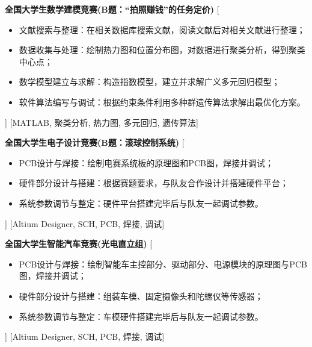 \documentclass[zh]{resume}
\begin{document}
\begin{experiences}
    {\textbf{全国大学生数学建模竞赛(B题：“拍照赚钱”的任务定价)}}%
    [%
        \begin{itemize}
            \item {文献搜索与整理：在相关数据库搜索文献，阅读文献后对相关文献进行整理；}
            \item {数据收集与处理：绘制热力图和位置分布图，对数据进行聚类分析，得到聚类中心点；}
            \item {数学模型建立与求解：构造指数模型，建立并求解广义多元回归模型；}
            \item {软件算法编写与调试：根据约束条件利用多种群遗传算法求解出最优化方案。}
        \end{itemize}]
    [MATLAB, 聚类分析, 热力图, 多元回归, 遗传算法]
    \separator{0.5ex}

    {\textbf{全国大学生电子设计竞赛(B题：滚球控制系统)}}
    [%
        \begin{itemize}
            \item {PCB设计与焊接：绘制电赛系统板的原理图和PCB图，焊接并调试；}
            \item {硬件部分设计与搭建：根据赛题要求，与队友合作设计并搭建硬件平台；}
            \item {系统参数调节与整定：硬件平台搭建完毕后与队友一起调试参数。}
        \end{itemize}]
    [Altium Designer, SCH, PCB, 焊接, 调试]
    \separator{0.5ex}

    {\textbf{全国大学生智能汽车竞赛(光电直立组)}}
    [%
        \begin{itemize}
            \item {PCB设计与焊接：绘制智能车主控部分、驱动部分、电源模块的原理图与PCB图，焊接并调试；}
            \item {硬件部分设计与搭建：组装车模、固定摄像头和陀螺仪等传感器；}
            \item {系统参数调节与整定：车模硬件搭建完毕后与队友一起调试参数。}
        \end{itemize}]
    [Altium Designer, SCH, PCB, 焊接, 调试]
\end{experiences}
\end{document}
